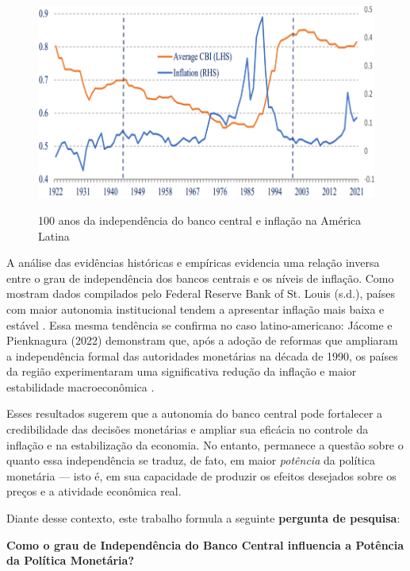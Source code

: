 \documentclass[a4paper,12pt]{article}
\begin{document}
\begin{figure}[H]
    \centering
    \caption{100 anos da independência do banco central e inflação na América Latina}
    \includegraphics[width=.85\linewidth]{Imagens/paperi2.png}
    \label{fig:fmi_independence}
\end{figure}

A análise das evidências históricas e empíricas evidencia uma relação inversa entre o grau de independência dos bancos centrais e os níveis de inflação. Como mostram dados compilados pelo Federal Reserve Bank of St. Louis (s.d.), países com maior autonomia institucional tendem a apresentar inflação mais baixa e estável \cite{stlouisfed-independencia}. Essa mesma tendência se confirma no caso latino-americano: Jácome e Pienknagura (2022) demonstram que, após a adoção de reformas que ampliaram a independência formal das autoridades monetárias na década de 1990, os países da região experimentaram uma significativa redução da inflação e maior estabilidade macroeconômica \cite{jacome2022}.

Esses resultados sugerem que a autonomia do banco central pode fortalecer a credibilidade das decisões monetárias e ampliar sua eficácia no controle da inflação e na estabilização da economia. No entanto, permanece a questão sobre o quanto essa independência se traduz, de fato, em maior \emph{potência} da política monetária — isto é, em sua capacidade de produzir os efeitos desejados sobre os preços e a atividade econômica real.

Diante desse contexto, este trabalho formula a seguinte \textbf{pergunta de pesquisa}:

\begin{center}
\vspace{0.5em}
\textbf{\Large Como o grau de Independência do Banco Central influencia a Potência da Política Monetária?}
\vspace{0.5em}
\end{center}
\end{document}
